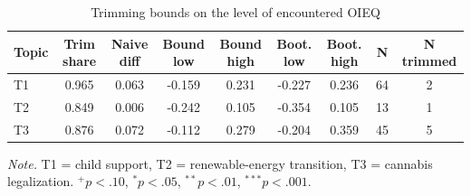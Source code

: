 \begin{table}[htbp]
\centering
\begin{threeparttable}
\caption{Trimming bounds on the level of encountered OIEQ}
\label{tab:tab_q_level_lee_bounds}
\begin{tabular}{lcccccccc}
\toprule
  Topic & Trim share & Naive diff & Bound low & Bound high & Boot. low & Boot. high & N & N trimmed \\
\midrule
  T1 & 0.965 & 0.063 & -0.159 & 0.231 & -0.227 & 0.236 & 64 & 2 \\
  T2 & 0.849 & 0.006 & -0.242 & 0.105 & -0.354 & 0.105 & 13 & 1 \\
  T3 & 0.876 & 0.072 & -0.112 & 0.279 & -0.204 & 0.359 & 45 & 5 \\
\bottomrule
\end{tabular}
\begin{tablenotes}\footnotesize\item \textit{Note.} T1 = child support, T2 = renewable-energy transition, T3 = cannabis legalization. $^{+}p<.10$, $^{*}p<.05$, $^{**}p<.01$, $^{***}p<.001$.\end{tablenotes}
\end{threeparttable}
\end{table}
